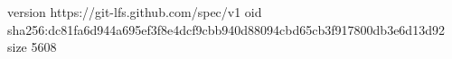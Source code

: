 version https://git-lfs.github.com/spec/v1
oid sha256:dc81fa6d944a695ef3f8e4dcf9cbb940d88094cbd65cb3f917800db3e6d13d92
size 5608
